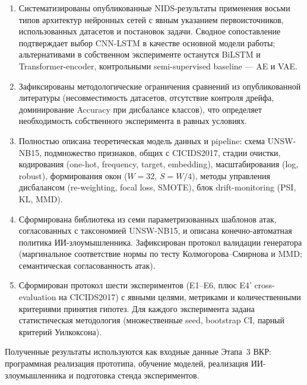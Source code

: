 \documentclass[14pt, a4paper]{extarticle}
\begin{document}
\begin{enumerate}
    \item Систематизированы опубликованные NIDS-результаты применения
    восьми типов архитектур нейронных сетей с явным указанием
    первоисточников, использованных датасетов и постановок задачи.
    Сводное сопоставление подтверждает выбор CNN-LSTM в качестве
    основной модели работы; альтернативами в собственном эксперименте
    останутся BiLSTM и Transformer-encoder, контрольными
    semi-supervised baseline --- AE и VAE.
    \item Зафиксированы методологические ограничения сравнений из
    опубликованной литературы (несовместимость датасетов, отсутствие
    контроля дрейфа, доминирование Accuracy при дисбалансе классов),
    что определяет необходимость собственного эксперимента в равных
    условиях.
    \item Полностью описана теоретическая модель данных и pipeline:
    схема UNSW-NB15, подмножество признаков, общих с CICIDS2017,
    стадии очистки, кодирования (one-hot, frequency, target, embedding),
    масштабирования (log, robust), формирования окон (\(W=32\),
    \(S=W/4\)), методы управления дисбалансом (re-weighting, focal loss,
    SMOTE), блок drift-monitoring (PSI, KL, MMD).
    \item Сформирована библиотека из семи параметризованных шаблонов
    атак, согласованных с таксономией UNSW-NB15, и описана
    конечно-автоматная политика ИИ-злоумышленника. Зафиксирован
    протокол валидации генератора (маргинальное соответствие нормы по
    тесту Колмогорова--Смирнова и MMD; семантическая согласованность
    атак).
    \item Сформирован протокол шести экспериментов (E1--E6, плюс E4'
    cross-evaluation на CICIDS2017) с явными целями, метриками и
    количественными критериями принятия гипотез. Для каждого эксперимента
    задана статистическая методология (множественные seed, bootstrap CI,
    парный критерий Уилкоксона).
\end{enumerate}

Полученные результаты используются как входные данные Этапа~3 ВКР:
программная реализация прототипа, обучение моделей, реализация
ИИ-злоумышленника и подготовка стенда экспериментов.

\printbibliography[title={СПИСОК ИСПОЛЬЗОВАННЫХ ИСТОЧНИКОВ}]

\label{LastPage}
\end{document}
